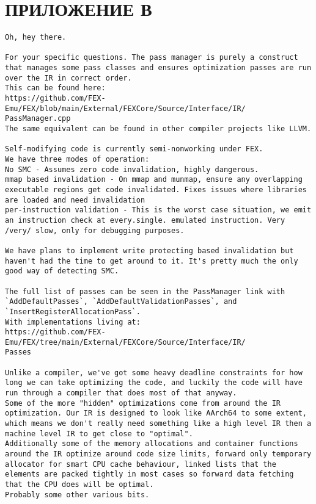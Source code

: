 \section*{ПРИЛОЖЕНИЕ В}

\begin{Verbatim}[fontsize=\footnotesize]
Oh, hey there.

For your specific questions. The pass manager is purely a construct
that manages some pass classes and ensures optimization passes are run
over the IR in correct order.
This can be found here:
https://github.com/FEX-Emu/FEX/blob/main/External/FEXCore/Source/Interface/IR/
PassManager.cpp
The same equivalent can be found in other compiler projects like LLVM.

Self-modifying code is currently semi-nonworking under FEX.
We have three modes of operation:
No SMC - Assumes zero code invalidation, highly dangerous.
mmap based invalidation - On mmap and munmap, ensure any overlapping
executable regions get code invalidated. Fixes issues where libraries
are loaded and need invalidation
per-instruction validation - This is the worst case situation, we emit
an instruction check at every.single. emulated instruction. Very
/very/ slow, only for debugging purposes.

We have plans to implement write protecting based invalidation but
haven't had the time to get around to it. It's pretty much the only
good way of detecting SMC.

The full list of passes can be seen in the PassManager link with
`AddDefaultPasses`, `AddDefaultValidationPasses`, and
`InsertRegisterAllocationPass`.
With implementations living at:
https://github.com/FEX-Emu/FEX/tree/main/External/FEXCore/Source/Interface/IR/
Passes

Unlike a compiler, we've got some heavy deadline constraints for how
long we can take optimizing the code, and luckily the code will have
run through a compiler that does most of that anyway.
Some of the more "hidden" optimizations come from around the IR
optimization. Our IR is designed to look like AArch64 to some extent,
which means we don't really need something like a high level IR then a
machine level IR to get close to "optimal".
Additionally some of the memory allocations and container functions
around the IR optimize around code size limits, forward only temporary
allocator for smart CPU cache behaviour, linked lists that the
elements are packed tightly in most cases so forward data fetching
that the CPU does will be optimal.
Probably some other various bits.


\end{Verbatim}

